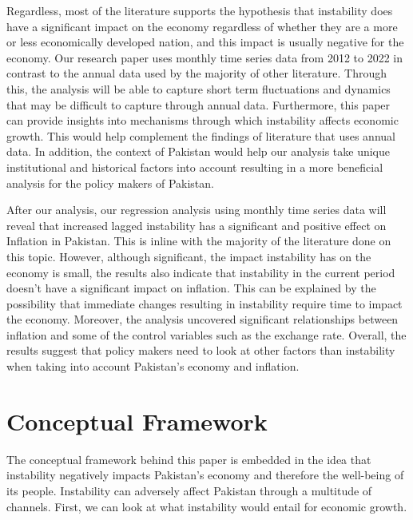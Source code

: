 \documentclass[11pt]{article}
\begin{document}
Regardless, most of the literature supports the hypothesis that instability does have a significant impact on the economy regardless of whether they are a more or less economically developed nation, and this impact is usually negative for the economy. Our research paper uses monthly time series data from 2012 to 2022 in contrast to the annual data used by the majority of other literature. Through this, the analysis will be able to capture short term fluctuations and dynamics that may be difficult to capture through annual data. Furthermore, this paper can provide insights into mechanisms through which instability affects economic growth. This would help complement the findings of literature that uses annual data. In addition, the context of Pakistan would help our analysis take unique institutional and historical factors into account resulting in a more beneficial analysis for the policy makers of Pakistan. \newline

After our analysis, our regression analysis using monthly time series data will reveal that increased lagged instability has a significant and positive effect on Inflation in Pakistan. This is inline with the majority of the literature done on this topic. However, although significant, the impact instability has on the economy is small, the results also indicate that instability in the current period doesn’t have a significant impact on inflation. This can be explained by the possibility that immediate changes resulting in instability require time to impact the economy. Moreover, the analysis uncovered significant relationships between inflation and some of the control variables such as the exchange rate. Overall, the results suggest that policy makers need to look at other factors than instability when taking into account Pakistan’s economy and inflation. 


\section{Conceptual Framework}

The conceptual framework behind this paper is embedded in the idea that instability negatively impacts Pakistan’s economy and therefore the well-being of its people. Instability can adversely affect Pakistan through a multitude of channels. First, we can look at what instability would entail for economic growth. \newline
\end{document}
